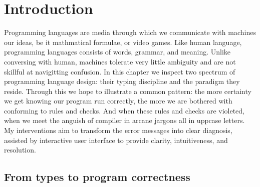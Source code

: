 
\chapter{Introduction}

\label{chap:introduction} 

\graphicspath{{Figures/Introduction}}

Programming languages are media through which we communicate with machines our ideas, be it mathmatical formulae, or video games. Like human language, programming languages consists of words, grammar, and meaning. Unlike conversing with human, machines tolerate very little ambiguity and are not skillful at navigitting confusion. In this chapter we inspect two spectrum of programming language design: their typing discipline and the paradigm they reside. Through this we hope to illustrate a common pattern: the more certainty we get knowing our program run correctly, the more we are bothered with conforming to rules and checks. And when these rules and checks are violeted, when we meet the anguish of compiler in arcane jargons all in uppcase letters. My interventions aim to transform the error messages into clear diagnosis, assisted by interactive user interface to provide clarity, intuitiveness, and resolution.   


\section{From types to program correctness}

